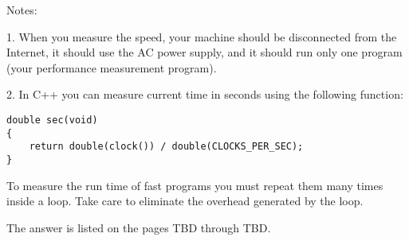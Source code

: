 \documentclass{article}
\begin{document}
		\noindent Notes:
		
		1. When you measure the speed, your machine should be disconnected from the Internet, it should use the AC power supply, and it should run only one program (your performance measurement program).
		
		2. In C++ you can measure current time in seconds using the following function:
		
		\begin{verbatim}
double sec(void)
{
    return double(clock()) / double(CLOCKS_PER_SEC);
}
		\end{verbatim}
		
		To measure the run time of fast programs you must repeat them many times inside a loop. Take care to eliminate the overhead generated by the loop.
		\newline
		
		The answer is listed on the pages TBD through TBD.
	
	



	
\end{document}
